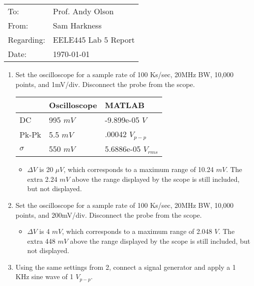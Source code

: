 \documentclass[letter,12pt]{article}
\begin{document}

\begin{flushleft}
	\begin{tabular}{l l}
		To: & Prof. Andy Olson \\
		From: & Sam Harkness \\
		Regarding: & EELE445 Lab 5 Report \\
		Date: & \mydate\today
	\end{tabular}
\end{flushleft}

\begin{enumerate}
	\item Set the oscilloscope for a sample rate of 100 Ks/sec, 20MHz BW, 10,000 points, and 1mV/div.  Disconnect the probe from the scope.
	
	\begin{tabular}{l | l | l}
		\hline
					& Oscilloscope 	& MATLAB 				\\
		\hline
		DC			& 995 $mV$ 		& -9.899e-05 $V$			\\ 
		\hline
		Pk-Pk		& 5.5 $mV$		& .00042 $V_{p-p}$		\\
		\hline
		$\sigma$	& 550 $mV$		& 5.6886e-05 $V_{rms}$	\\
		\hline
	\end{tabular}
	
	\begin{itemize}
		\item $\Delta V$ is 20 $\mu V$, which corresponds to a maximum range of 10.24 $mV$.  The extra 2.24 $mV$ above the range displayed by the scope is still included, but not displayed.
	\end{itemize}
	
	\item Set the oscilloscope for a sample rate of 100 Ks/sec, 20MHz BW, 10,000 points, and 200mV/div.  Disconnect the probe from the scope.
	
	\begin{itemize}
		\item $\Delta V$ is 4 $mV$, which corresponds to a maximum range of 2.048 $V$.  The extra 448 $mV$ above the range displayed by the scope is still included, but not displayed.
	\end{itemize}
	
	\item Using the same settings from 2, connect a signal generator and apply a 1 KHz sine wave of 1 $V_{p-p}$.
	

\end{enumerate}
\end{document}

